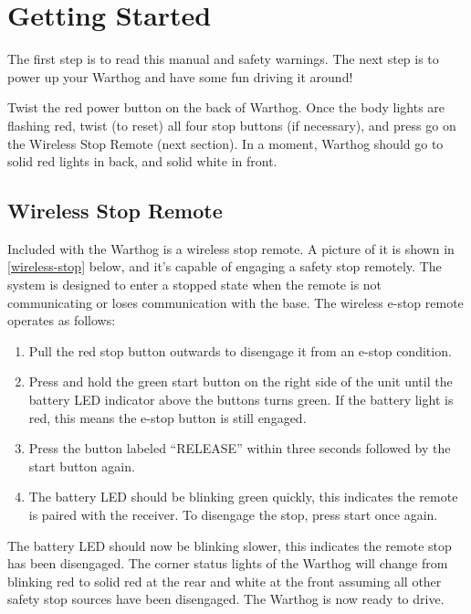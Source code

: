 \documentclass[]{clearpath-latex/clearpath-manual}
\begin{document}
\section{Getting Started}

The first step is to read this manual and safety warnings.  The next step is to power up your Warthog and have some fun driving it around!

Twist the red power button on the back of Warthog. Once the body lights are flashing red, twist (to reset) all four stop buttons (if necessary), and press go on the Wireless Stop Remote (next section). In a moment, Warthog should go to solid red lights in back, and solid white in front.

\subsection{Wireless Stop Remote}

Included with the Warthog is a wireless stop remote. A picture of it is shown in  
\autoref{wireless-stop} below, and it's capable of engaging a safety stop remotely.  The system is designed to enter a stopped state when the remote is not communicating or loses communication with the base. The wireless e-stop remote operates as follows: 

\begin{enumerate}
  \item Pull the red stop button outwards to disengage it from an e-stop condition.
  \item Press and hold the green start button on the right side of the unit until the battery LED indicator above the buttons turns green. If the battery light is red, this means the e-stop button is still engaged. 
  \item Press the button labeled “RELEASE” within three seconds followed by the start button again. 
  \item The battery LED should be blinking green quickly, this indicates the remote is paired with the receiver. To disengage the stop, press start once again. 
\end{enumerate}

The battery LED should now be blinking slower, this indicates the remote stop has been disengaged. The corner status lights of the Warthog will change from blinking red to solid red at the rear and white at the front assuming all other safety stop sources have been disengaged. The Warthog is now ready to drive.
\end{document}
